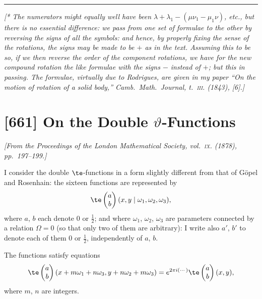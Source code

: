 \documentclass[11pt,a4paper]{book}
\begin{document}
\smallskip
\noindent\rule{0.4\textwidth}{0.4pt}

\noindent\textit{[* The numerators might equally well have been $\lambda + \lambda_1 - (\mu\nu_1 - \mu_1\nu)$, etc., but there is no essential difference: we pass from one set of formulae to the other by reversing the signs of all the symbols: and hence, by properly fixing the sense of the rotations, the signs may be made to be $+$ as in the text. Assuming this to be so, if we then reverse the order of the component rotations, we have for the new compound rotation the like formulae with the signs $-$ instead of $+$; but this in passing. The formulae, virtually due to Rodrigues, are given in my paper ``On the motion of rotation of a solid body,'' \emph{Camb.~Math.~Journal}, t.~\textsc{iii}. (1843), [6].]}

\newpage
\section{[661] On the Double $\vartheta$-Functions}
\label{sec:661}

\noindent\textit{[From the \emph{Proceedings of the London Mathematical Society}, vol.~\textsc{ix}. (1878), pp.~197--199.]}

\medskip

I consider the double $\te$-functions in a form slightly different from that of G\"{o}pel and Rosenhain: the sixteen functions are represented by
\[
\te\begin{pmatrix} a \\ b \end{pmatrix}(x, y \mid \omega_1, \omega_2, \omega_3),
\]
where $a$, $b$ each denote $0$ or $\frac{1}{2}$; and where $\omega_1$, $\omega_2$, $\omega_3$ are parameters connected by a relation $\Omega = 0$ (so that only two of them are arbitrary): I write also $a'$, $b'$ to denote each of them $0$ or $\frac{1}{2}$, independently of $a$, $b$.

The functions satisfy equations
\[
\te\begin{pmatrix} a \\ b \end{pmatrix}(x + m\omega_1 + n\omega_3, y + n\omega_2 + m\omega_3) = e^{2\pi i(\cdots)} \te\begin{pmatrix} a \\ b \end{pmatrix}(x, y),
\]
where $m$, $n$ are integers.
\end{document}
